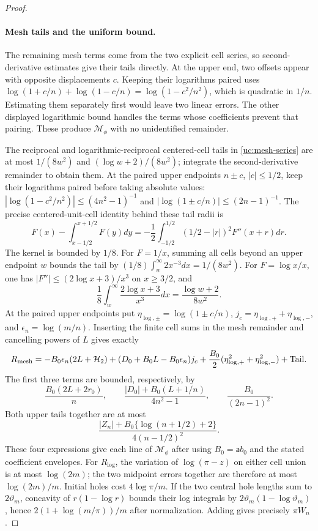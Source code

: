 \begin{proof}
\paragraph{Mesh tails and the uniform bound.}
The remaining mesh terms come from the two explicit cell series, so
second-derivative estimates give their tails directly. At the upper
end, two offsets appear with opposite displacements $c$. Keeping their
logarithms paired uses
$\log(1+c/n)+\log(1-c/n)=\log(1-c^2/n^2)$, which is quadratic
in $1/n$. Estimating them separately first would leave two linear
errors. The other displayed logarithmic bound handles the terms whose
coefficients prevent that pairing. These produce $\mathcal M_\phi$
with no unidentified remainder.

The reciprocal and logarithmic-reciprocal centered-cell tails in
\eqref{uc:mesh-series} are at most $1/(8w^2)$ and
$(\log w+2)/(8w^2)$; integrate the second-derivative remainder to
obtain them. At the paired upper endpoints $n\pm c$, $|c|\leq1/2$,
keep their logarithms paired before taking absolute values:
$|\log(1-c^2/n^2)|\leq(4n^2-1)^{-1}$ and
$|\log(1\pm c/n)|\leq(2n-1)^{-1}$.
The precise centered-unit-cell identity behind these tail radii is
\[
 F(x)-\int_{x-1/2}^{x+1/2}F(y)dy
 =-\frac12\int_{-1/2}^{1/2}(1/2-|r|)^2 F''(x+r)dr.
\]
The kernel is bounded by $1/8$. For $F=1/x$, summing all cells
beyond an upper endpoint $w$ bounds the tail by
$(1/8)\int_w^\infty2x^{-3}dx=1/(8w^2)$.
For $F=\log x/x$, one has
$|F''|\leq(2\log x+3)/x^3$ on $x\geq3/2$, and
\[
 \frac18\int_w^\infty\frac{2\log x+3}{x^3}dx
 =\frac{\log w+2}{8w^2}.
\]
At the paired upper endpoints put
$\eta_{\log,\pm}=\log(1\pm c/n)$, $j_c=\eta_{\log,+}+\eta_{\log,-}$, and
$\epsilon_n=\log(m/n)$. Inserting the finite cell sums in the
mesh remainder and cancelling powers of $L$ gives exactly
\[
 R_{\rm mesh}=-B_0\epsilon_n(2L+\mathcal H_2)
 +(D_0+B_0L-B_0\epsilon_n)j_c
 +\frac{B_0}{2}(\eta_{\log,+}^2+\eta_{\log,-}^2)+\mathrm{Tail}.
\]
The first three terms are bounded, respectively, by
\[
 \frac{B_0(2L+2r_0)}n,\qquad
 \frac{|D_0|+B_0(L+1/n)}{4n^2-1},\qquad
 \frac{B_0}{(2n-1)^2}.
\]
Both upper tails together are at most
\[
 \frac{|Z_n|+B_0\{\log(n+1/2)+2\}}{4(n-1/2)^2}.
\]
These four expressions give each line of $\mathcal M_\phi$ after
using $B_0=\mathsf{a}b_0$ and the stated coefficient envelopes.
For $R_{\log}$, the variation of $\log(\pi-z)$ on either cell
union is at most $\log(2m)$; the two midpoint errors together are
therefore at most $\log(2m)/m$. Initial holes cost
$4\log\pi/m$. If the two central hole lengths sum to $2\vartheta_m$,
concavity of $r(1-\log r)$ bounds their log integrals by
$2\vartheta_m(1-\log \vartheta_m)$, hence $2(1+\log(m/\pi))/m$ after normalization.
Adding gives precisely $\pi W_n$.


\end{proof}
